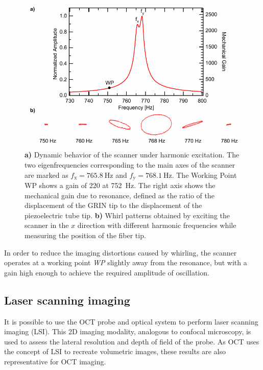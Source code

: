 \documentclass[10pt]{iopart}
\begin{document}
\begin{figure}[h!]\centering \includegraphics[width=\columnwidth]{figures/bodeWhirl.pdf}
      \caption{\textbf{a)} Dynamic behavior of the scanner under harmonic excitation. The two eigenfrequencies corresponding to the main axes of the scanner are marked as $f_\mathrm{x} = \SI{765.8}{\hertz}$ and $f_\mathrm{y} = \SI{768.1}{\hertz}$.
      The Working Point WP shows a gain of 220 at \SI{752}{\hertz}. 
      The right axis shows the mechanical gain due to resonance, defined as the ratio of the displacement of the GRIN tip to the displacement of the piezoelectric tube tip.
      \textbf{b)} Whirl patterns obtained by exciting the scanner in the $x$ direction with different harmonic frequencies while measuring the position of the fiber tip. }
      \label{fig:bode}
\end{figure}

In order to reduce the imaging distortions caused by whirling, the scanner operates at a working point \textit{WP} slightly away from the resonance, but with a gain high enough to achieve the required amplitude of oscillation.


\subsection{Laser scanning imaging}


It is possible to use the OCT probe and optical system to perform laser scanning imaging (LSI). This 2D imaging modality, analogous to confocal microscopy, is used to assess the lateral resolution and depth of field of the probe. As OCT uses the concept of LSI to recreate volumetric images, these results are also representative for OCT imaging.
\end{document}
